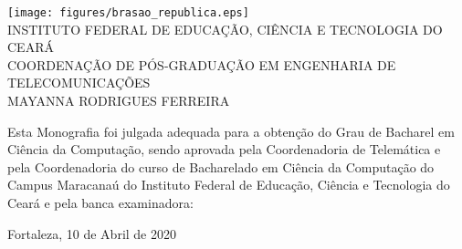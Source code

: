 \begin{folhadeaprovacao}
\setlength{\ABNTsignthickness}{0.2pt}
\setlength{\ABNTsignskip}{1.7cm}

\begin{center}
\texttt{[image: figures/brasao\_republica.eps]}\\

            {INSTITUTO FEDERAL DE EDUCAÇÃO, CIÊNCIA E TECNOLOGIA DO CEARÁ} \\
            {COORDENAÇÃO DE PÓS-GRADUAÇÃO EM ENGENHARIA DE TELECOMUNICAÇÕES}  \\

    \vspace{1.5cm}
                                    {MAYANNA RODRIGUES FERREIRA}\\
    \bfseries{}
\end{center}

Esta Monografia foi julgada adequada para a obten\c{c}\~{a}o do Grau de Bacharel em Ciência da Computação, sendo aprovada pela Coordenadoria de Telemática e pela Coordenadoria do curso de Bacharelado em Ciência da Computação do Campus Maracanaú do Instituto Federal de Educação, Ciência e Tecnologia do Ceará e pela banca examinadora:

    \vspace{0.15cm}
   
    \vspace{0.15cm}%

    \begin{center}
        Fortaleza, 10 de Abril de 2020
    \end{center}
\end{folhadeaprovacao}